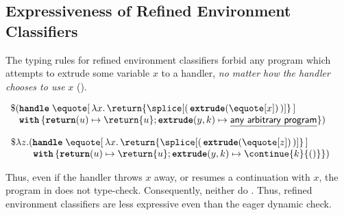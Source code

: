 \subsection{Expressiveness of Refined Environment Classifiers}\label{subsection:rec-formal-expressiveness}
The typing rules for refined environment classifiers forbid any program which attempts to extrude some variable $x$ to a handler, \textit{no matter how the handler chooses to use} $x$ ().

\begin{code}
\begin{source}
$\begin{array}{l}
  \$ (\textbf{\texttt{handle}} \; \equote[\, {\lambda x. \, \return{\splice[(\, {{\textbf{\texttt{extrude}}(\equote[x])}} \, )]}} \, ] \\
  \;\;\,\, \textbf{\texttt{with}} \, \{ \textbf{\texttt{return}}(u) \mapsto {\return{u}}; \textbf{\texttt{extrude}}(y, k) \mapsto {\underline{\textsf{any arbitrary program}}}\})
\end{array}$
\end{source}
%
\label{listing:refined-environment-classifiers-expressiveness}
\end{code}


\begin{code}
\begin{source}
$\begin{array}{l}
  \$ \lambda z. (\textbf{\texttt{handle}} \; \equote[\, {\lambda x. \, \return{\splice[( \, {{\textbf{\texttt{extrude}}(\equote[z])}} \, )]}} \,] \\
  \quad \quad \,\, \textbf{\texttt{with}} \, \{ \textbf{\texttt{return}}(u) \mapsto {\return{u}}; \textbf{\texttt{extrude}}(y, k) \mapsto {\continue{k}{()}}\})
\end{array}$
\end{source}
%
\label{listing:refined-environment-classifiers-safe}
\end{code}

Thus, even if the handler throws $x$ away, or resumes a continuation with $x$, the program in  does not type-check. Consequently, neither do . Thus, refined environment classifiers are less expressive even than the eager dynamic check. 


